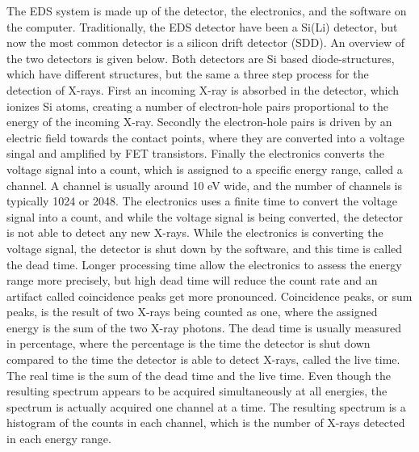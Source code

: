 The EDS system is made up of the detector, the electronics, and the software on the computer.
Traditionally, the EDS detector have been a Si(Li) detector, but now the most common detector is a silicon drift detector (SDD).
An overview of the two detectors is given below.
Both detectors are Si based diode-structures, which have different structures, but the same a three step process for the detection of X-rays.
First an incoming X-ray is absorbed in the detector, which ionizes Si atoms, creating a number of electron-hole pairs proportional to the energy of the incoming X-ray.
Secondly the electron-hole pairs is driven by an electric field towards the contact points, where they are converted into a voltage singal and amplified by FET transistors.
Finally the electronics converts the voltage signal into a count, which is assigned to a specific energy range, called a channel.
A channel is usually around 10 eV wide, and the number of channels is typically 1024 or 2048.
The electronics uses a finite time to convert the voltage signal into a count, and while the voltage signal is being converted, the detector is not able to detect any new X-rays.
While the electronics is converting the voltage signal, the detector is shut down by the software, and this time is called the dead time.
Longer processing time allow the electronics to assess the energy range more precisely, but high dead time will reduce the count rate  and an artifact called coincidence peaks get more pronounced.
Coincidence peaks, or sum peaks, is the result of two X-rays being counted as one, where the assigned energy is the sum of the two X-ray photons.
The dead time is usually measured in percentage, where the percentage is the time the detector is shut down compared to the time the detector is able to detect X-rays, called the live time.
The real time is the sum of the dead time and the live time.
Even though the resulting spectrum appears to be acquired simultaneously at all energies, the spectrum is actually acquired one channel at a time.
The resulting spectrum is a histogram of the counts in each channel, which is the number of X-rays detected in each energy range.



